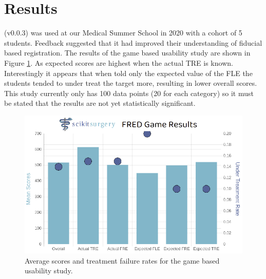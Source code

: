 \section{Results}
\fred (v0.0.3)\cite{stephen_thompson_2020_3946090} was used at our Medical Summer School in 2020 with a cohort of 5 students. Feedback suggested that it had improved their understanding
of fiducial based registration. The results of the game based usability study are shown in Figure \ref{fig:usability}. As expected scores are 
highest when the actual \gls{TRE} is known. Interestingly it appears that when told only the expected value of the \gls{FLE} the students
tended to under treat the target more, resulting in lower overall scores. This study currently only has 100 data points (20 for each category)
so it must be stated that the results are not yet statistically significant. 

\begin{figure}
        \begin{center}
        \includegraphics[width=0.5\linewidth]{usability.eps}
                \caption{\label{fig:usability}Average scores and treatment failure rates for the game based usability study.}
	\end{center}
\end{figure}


